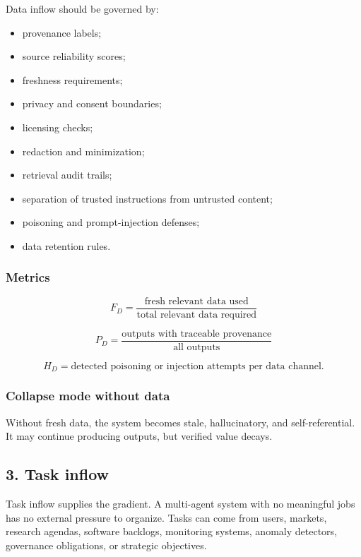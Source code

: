 \documentclass[11pt]{article}
\providecommand{\tightlist}{\setlength{\itemsep}{0pt}\setlength{\parskip}{0pt}}
\begin{document}
Data inflow should be governed by:

\begin{itemize}
\tightlist
\item
  provenance labels;
\item
  source reliability scores;
\item
  freshness requirements;
\item
  privacy and consent boundaries;
\item
  licensing checks;
\item
  redaction and minimization;
\item
  retrieval audit trails;
\item
  separation of trusted instructions from untrusted content;
\item
  poisoning and prompt-injection defenses;
\item
  data retention rules.
\end{itemize}

\subsubsection{Metrics}\label{metrics-1}

\[
F_D=\frac{\text{fresh relevant data used}}{\text{total relevant data required}}
\]

\[
P_D=\frac{\text{outputs with traceable provenance}}{\text{all outputs}}
\]

\[
H_D=\text{detected poisoning or injection attempts per data channel}.
\]

\subsubsection{Collapse mode without data}\label{collapse-mode-without-data}

Without fresh data, the system becomes stale, hallucinatory, and self-referential. It may continue producing outputs, but verified value decays.

\subsection{3. Task inflow}\label{task-inflow}

Task inflow supplies the gradient. A multi-agent system with no meaningful jobs has no external pressure to organize. Tasks can come from users, markets, research agendas, software backlogs, monitoring systems, anomaly detectors, governance obligations, or strategic objectives.
\end{document}
